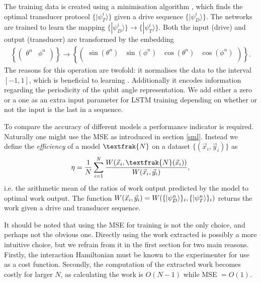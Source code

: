 The training data is created using a minimisation algorithm \cite{2020SciPy-NMeth}, which finds the optimal transducer protocol $\{|\psi_T^i \rangle\}$ given a drive sequence $\{|\psi_D^i \rangle\}$.
The networks are trained to learn the mapping $\{|\psi_D^i \rangle\} \to \{|\psi_T^i \rangle\}$.
Both the input (drive) and output (transducer) are transformed by the embedding
\begin{align*}
	\left\{
	\begin{pmatrix}
	\theta^n & \phi^n \\
	\end{pmatrix}
	\right\}
	\to
	\left\{
	\begin{pmatrix}
	\sin(\theta^n) & \sin(\phi^n) & \cos(\theta^n)  & \cos(\phi^n) \\
	\end{pmatrix}
	\right\}.
\end{align*}
The reasons for this operation are twofold: it normalises the data to the interval $[-1, 1]$, which is beneficial to learning \cite{LeCun2012}. Additionally it encodes information regarding the periodicity of the qubit angle representation.
We add either a zero or a one as an extra input parameter for LSTM training depending on whether or not the input is the last in a sequence.

To compare the accuracy of different models a performance indicator is required. 
Naturally one might use the MSE as introduced in section \ref{sml}.
Instead we define the \textit{efficiency} of a model $\textfrak{N}$ on a dataset $\{(\vec{x}_i, \vec{y}_i)\}$ as
\begin{align}
	\eta = \frac{1}{N} \sum_{i=1}^N \frac{W(\vec{x}_i,\textfrak{N}(\vec{x}_i))}{W(\vec{x}_i,\vec{y}_i)},
\end{align}
i.e. the arithmetic mean of the ratios of work output predicted by the model to optimal work output.
The function $W(\vec{x}_i, \vec{y}_i) = W(\{\ket{\psi_D^n}\}_i, \{\ket{\psi_T^n}\}_i)$ returns the work given a drive and transducer sequence.

It should be noted that using the MSE for training is not the only choice, and perhaps not the obvious one.
Directly using the work extracted is possibly a more intuitive choice, but we refrain from it in the first section for two main reasons.
Firstly, the interaction Hamiltonian must be known to the experimenter for use as a cost function.
Secondly, the computation of the extracted work becomes costly for larger $N$, as calculating the work is $O(N-1)$ while MSE $= O(1)$.
